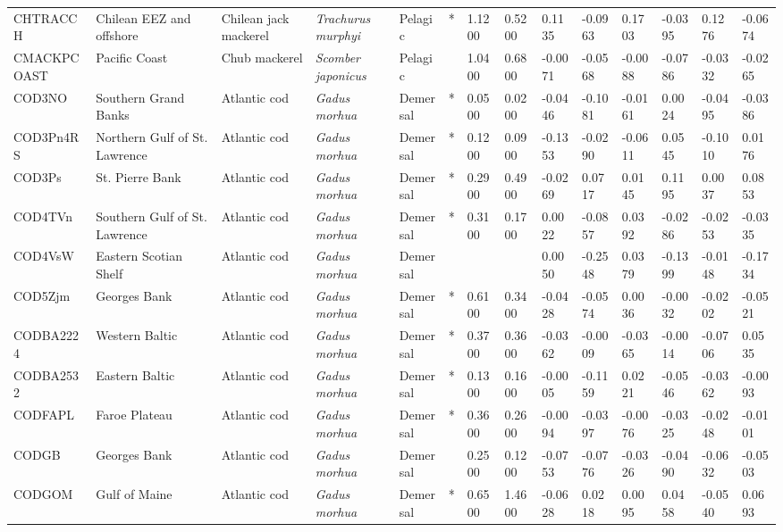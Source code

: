 \begin{longtable}{p{2.8cm}p{2cm}p{1.7cm}p{1.7cm}p{1cm}p{0.3cm}p{1cm}p{1cm}p{1cm}p{1cm}p{1cm}p{1cm}p{1cm}p{1cm}}
  CHTRACCH & Chilean EEZ and offshore & Chilean jack mackerel & \textit{Trachurus murphyi} & Pelagic & * & 1.1200 & 0.5200 & 0.1135 & -0.0963 & 0.1703 & -0.0395 & 0.1276 & -0.0674 \\ 
  CMACKPCOAST & Pacific Coast & Chub mackerel & \textit{Scomber japonicus} & Pelagic &   & 1.0400 & 0.6800 & -0.0071 & -0.0568 & -0.0088 & -0.0786 & -0.0332 & -0.0265 \\ 
  COD3NO & Southern Grand Banks & Atlantic cod & \textit{Gadus morhua} & Demersal & * & 0.0500 & 0.0200 & -0.0446 & -0.1081 & -0.0161 & 0.0024 & -0.0495 & -0.0386 \\ 
  COD3Pn4RS & Northern Gulf of St. Lawrence & Atlantic cod & \textit{Gadus morhua} & Demersal & * & 0.1200 & 0.0900 & -0.1353 & -0.0290 & -0.0611 & 0.0545 & -0.1010 & 0.0176 \\ 
  COD3Ps & St. Pierre Bank & Atlantic cod & \textit{Gadus morhua} & Demersal & * & 0.2900 & 0.4900 & -0.0269 & 0.0717 & 0.0145 & 0.1195 & 0.0037 & 0.0853 \\ 
  COD4TVn & Southern Gulf of St. Lawrence & Atlantic cod & \textit{Gadus morhua} & Demersal & * & 0.3100 & 0.1700 & 0.0022 & -0.0857 & 0.0392 & -0.0286 & -0.0253 & -0.0335 \\ 
  COD4VsW & Eastern Scotian Shelf & Atlantic cod & \textit{Gadus morhua} & Demersal &  &  &  & 0.0050 & -0.2548 & 0.0379 & -0.1399 & -0.0148 & -0.1734 \\ 
  COD5Zjm & Georges Bank & Atlantic cod & \textit{Gadus morhua} & Demersal & * & 0.6100 & 0.3400 & -0.0428 & -0.0574 & 0.0036 & -0.0032 & -0.0202 & -0.0521 \\ 
  CODBA2224 & Western Baltic & Atlantic cod & \textit{Gadus morhua} & Demersal & * & 0.3700 & 0.3600 & -0.0362 & -0.0009 & -0.0365 & -0.0014 & -0.0706 & 0.0535 \\ 
  CODBA2532 & Eastern Baltic & Atlantic cod & \textit{Gadus morhua} & Demersal & * & 0.1300 & 0.1600 & -0.0005 & -0.1159 & 0.0221 & -0.0546 & -0.0362 & -0.0093 \\ 
  CODFAPL & Faroe Plateau & Atlantic cod & \textit{Gadus morhua} & Demersal & * & 0.3600 & 0.2600 & -0.0094 & -0.0397 & -0.0076 & -0.0325 & -0.0248 & -0.0101 \\ 
  CODGB & Georges Bank & Atlantic cod & \textit{Gadus morhua} & Demersal &   & 0.2500 & 0.1200 & -0.0753 & -0.0776 & -0.0326 & -0.0490 & -0.0632 & -0.0503 \\ 
  CODGOM & Gulf of Maine & Atlantic cod & \textit{Gadus morhua} & Demersal & * & 0.6500 & 1.4600 & -0.0628 & 0.0218 & 0.0095 & 0.0458 & -0.0540 & 0.0693 \\ 

\end{longtable}
